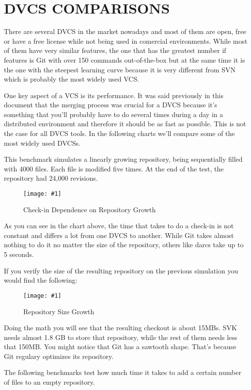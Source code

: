 \documentclass[a4paper,10pt]{article}
\newcommand{\diagrama}[2]{
    \begin{figure}[h]
        \begin{center}
            \texttt{[image: \#1]} 
        \end{center}
        \caption{#2}
    \end{figure}
}
\begin{document}
\section{DVCS COMPARISONS}
\label{DVCS COMPARISONS}

There are several DVCS in the market nowadays and most of them are open, free or have a free license while not being used in comercial environments. While most of them have very similar features, the one that has the greatest number if features is Git with over 150 commands out-of-the-box but at the same time it is the one with the steepest learning curve because it is very different from SVN which is probably the most widely used VCS.

One key aspect of a VCS is its performance. It was said previously in this document that the merging process was crucial for a DVCS because it's something that you'll probably have to do several times during a day in a distributed environment and therefore it should be as fast as possible. This is not the case for all DVCS tools. In the following charts\cite{dvcsperfcomparison} we'll compare some of the most widely used DVCSs.

This benchmark simulates a linearly growing repository, being sequentially filled with 4000 files. Each file is modified five times. At the end of the test, the repository had 24,000 revisions. 

\diagrama{dvcs_roundup_plot_commits.jpg}{Check-in Dependence on Repository Growth}

As you can see in the chart above, the time that takes to do a check-in is not constant and differs a lot from one DVCS to another. While Git takes almost nothing to do it no matter the size of the repository, others like darcs take up to 5 seconds.

If you verify the size of the resulting repository on the previous simulation you would find the following:

\diagrama{dvcs_roundup_plot_sizes.jpg}{Repository Size Growth}

Doing the math you will see that the resulting checkout is about 15MBs. SVK needs almost 1.8 GB to store that repository, while the rest of them needs less that 150MB. You might notice that Git has a sawtooth shape. That's because Git regulary optimizes its repository.

The following benchmarks test how much time it takes to add a certain number of files to an empty repository.
\end{document}
